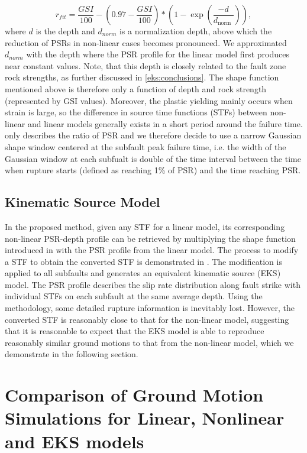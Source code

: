 \begin{equation}\label{eq:eks-2}
    r_{f i t}=\frac{G S I}{100} - \left(0.97-\frac{G S I}{100}\right) * (1 - \exp \left(\frac{-d}{d_{\text {norm }}}\right)),
\end{equation}
where $d$ is the depth and $d_{norm}$ is a normalization depth, above which the reduction of PSRs in non-linear cases becomes pronounced. We approximated $d_{norm}$ with the depth where the PSR profile for the linear model first produces near constant values. Note, that this depth is closely related to the fault zone rock strengths, as further discussed in \cref{eks:conclusions}. The shape function mentioned above is therefore only a function of depth and rock strength (represented by GSI values). Moreover, the plastic yielding mainly occurs when strain is large, so the difference in source time functions (STFs) between non-linear and linear models generally exists in a short period around the failure time.  only describes the ratio of PSR and we therefore decide to use a narrow Gaussian shape window centered at the subfault peak failure time, i.e. the width of the Gaussian window at each subfualt is double of the time interval between the time when rupture starts (defined as reaching 1\% of PSR) and the time reaching PSR.

\subsection{Kinematic Source Model}
In the proposed method, given any STF for a linear model, its corresponding non-linear PSR-depth profile can be retrieved by multiplying the shape function introduced in  with the PSR profile from the linear model. 
The process to modify a STF to obtain the converted STF is demonstrated in . The modification is applied to all subfaults and generates an equivalent kinematic source (EKS) model. The PSR profile describes the slip rate distribution along fault strike with individual STFs on each subfault at the same average depth. Using the methodology, some detailed rupture information is inevitably lost. However, the converted STF is reasonably close to that for the non-linear model, suggesting that it is reasonable to expect that the EKS model is able to reproduce reasonably similar ground motions to that from the non-linear model, which we demonstrate in the following section.

\section{Comparison of Ground Motion Simulations for Linear, Nonlinear and EKS models}

